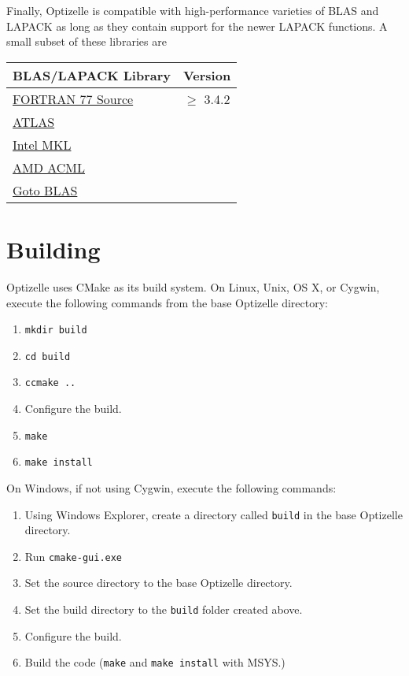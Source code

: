 \documentclass{report}
\begin{document}
        Finally, Optizelle is compatible with high-performance varieties of BLAS and LAPACK as long as they contain support for the newer LAPACK functions.  A small subset of these libraries are
\label{tbl:blaslapack}
\begin{center}\begin{tabular}{|l|l|}\hline
{\bf BLAS/LAPACK Library} & \bf{Version}\\\hline
\href{http://www.netlib.org/lapack}{FORTRAN 77 Source} & $\geq$ 3.4.2\\\hline
\href{http://math-atlas.sourceforge.net}{ATLAS} & \\\hline
\href{http://software.intel.com/en-us/intel-mkl}{Intel MKL} & \\\hline
\href{http://developer.amd.com/tools-and-sdks/cpu-development/amd-core-math-library-acml}{AMD ACML} & \\\hline
\href{https://www.tacc.utexas.edu/tacc-projects/gotoblas2}{Goto BLAS} & \\\hline
\end{tabular}\end{center}

\section{Building}

        Optizelle uses CMake as its build system.  On Linux, Unix, OS X, or Cygwin, execute the following commands from the base Optizelle directory:
\begin{enumerate}
    \item {\tt mkdir build}
    \item {\tt cd build}
    \item {\tt ccmake ..}
    \item Configure the build.
    \item {\tt make}
    \item {\tt make install} 
\end{enumerate}
On Windows, if not using Cygwin, execute the following commands:
\begin{enumerate}
    \item Using Windows Explorer, create a directory called {\tt build} in the base Optizelle directory.
    \item Run {\tt cmake-gui.exe}
    \item Set the source directory to the base Optizelle directory.
    \item Set the build directory to the {\tt build} folder created above.
    \item Configure the build.
    \item Build the code (\texttt{make} and \texttt{make install} with MSYS.)
\end{enumerate}
\end{document}
